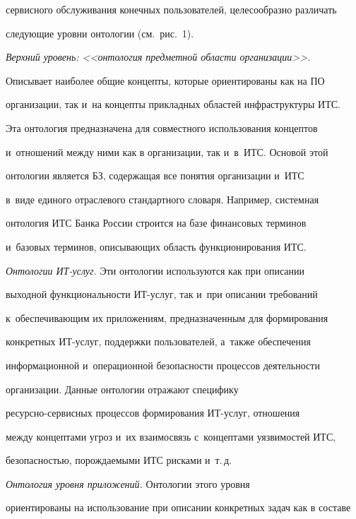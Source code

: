 сервисного обслуживания конечных пользователей, целесообразно различать


следующие уровни онтологии (см.\ рис.~1).





  \textit{Верхний уровень: <<онтология предметной области организации>>.}


Описывает наиболее общие концепты, которые ориентированы как на ПО


организации, так и~на концепты прикладных областей инфраструктуры ИТС.


Эта онтология предназначена для совместного использования концептов


и~отношений между ними как в организации, так и~в~ИТС. Основой этой


онтологии является БЗ, содержащая все понятия организации и~ИТС


в~виде единого отраслевого стандартного словаря. Например, системная


онтология ИТС Банка России строится на базе финансовых терминов


и~базовых терминов, описывающих область функционирования ИТС.





  \textit{Онтологии ИТ-услуг.} Эти онтологии используются как при описании


выходной функциональности ИТ-услуг, так и~при описании требований


к~обеспечивающим их приложениям, предназначенным для формирования


конкретных ИТ-услуг, поддержки пользователей, а~так\-же обеспечения


информационной и~операционной безопасности процессов деятельности


организации. Данные онтологии отражают специфику


  ре\-сурс\-но-сер\-вис\-ных процессов формирования ИТ-услуг, отношения


между концептами угроз и~их взаимосвязь с~концептами уязвимостей ИТС,


безопасностью, порождаемыми ИТС рисками и~т.\,д.





  \textit{Онтология уровня приложений.} Онтологии этого уровня


ориентированы на использование при описании конкретных задач как в составе


